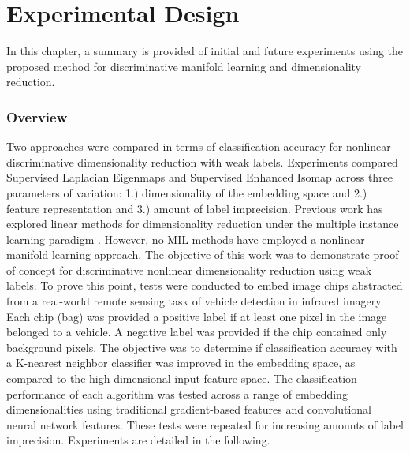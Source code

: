 \chapter{Experimental Design}
In this chapter, a summary is provided of initial and future experiments using the proposed method for discriminative manifold learning and dimensionality reduction. 

\subsection{Overview}
Two approaches were compared in terms of classification accuracy for nonlinear discriminative dimensionality reduction with weak labels.  Experiments compared Supervised Laplacian Eigenmaps and Supervised Enhanced Isomap  across three parameters of variation: 1.) dimensionality of the embedding space and 2.) feature representation and 3.) amount of label imprecision.  Previous work has explored linear methods for dimensionality reduction under the multiple instance learning paradigm \citep{Sun2010MIDR, Ping2010MILDRMaxMargin, Kim2010LocalDRMIL}.  However, no MIL methods have employed a nonlinear manifold learning approach.  The objective of this work was to demonstrate proof of concept for discriminative nonlinear dimensionality reduction using weak labels.  To prove this point, tests were conducted to embed image chips abstracted from a real-world remote sensing task of vehicle detection in infrared imagery.  Each chip (bag) was provided a positive label if at least one pixel in the image belonged to a vehicle.  A negative label was provided if the chip contained only background pixels.  The objective was to determine if classification accuracy with a K-nearest neighbor classifier was improved in the embedding space, as compared to the high-dimensional input feature space.  The classification performance of each algorithm was tested across a range of embedding dimensionalities using traditional gradient-based features and convolutional neural network features.  These tests were repeated for increasing amounts of label imprecision.  Experiments are detailed in the following.   

